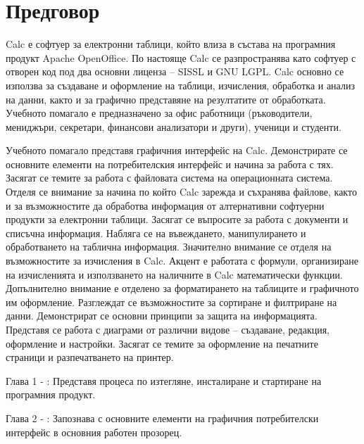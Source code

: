 ﻿\newpage
{}
\chapter*{Предговор}
\setcounter{page}{1}
\pagestyle{fancyplain}

Calc е софтуер за електронни таблици, който влиза в състава на програмния продукт Apache OpenOffice. По настояще Calc се разпространява като софтуер с отворен код под два основни лиценза – SISSL и GNU LGPL. Calc основно се използва за създаване и оформление на таблици, изчисления, обработка и анализ на данни, както и за графично представяне на резултатите от обработката. Учебното помагало е предназначено за офис работници (ръководители, мениджъри, секретари, финансови анализатори и други), ученици и студенти. 

Учебното помагало представя графичния интерфейс на Calc. Демонстрирате се основните елементи на потребителския интерфейс и начина за работа с тях. Засягат се темите за работа с файловата система на операционната система. Отделя се внимание за начина по който Calc зарежда и съхранява файлове, както и за възможностите да обработва информация от алтернативни софтуерни продукти за електронни таблици. Засягат се въпросите за работа с документи и списъчна информация. Набляга се на въвеждането, манипулирането и обработването на таблична информация. Значително внимание се отделя на възможностите за изчисления в Calc. Акцент е работата с формули, организиране на изчисленията и използването на наличните в Calc математически функции. Допълнително внимание е отделено за форматирането на таблиците и графичното им оформление. Разглеждат се възможностите за сортиране и филтриране на данни. Демонстрират се основни принципи за защита на информацията. Представя се работа с диаграми от различни видове – създаване, редакция, оформление и настройки. Засягат се темите за оформление на печатните страници и разпечатването на принтер. 

Глава 1 - : Представя процеса по изтегляне, инсталиране и стартиране на програмния продукт.

Глава 2 - : Запознава с основните елементи на графичния потребителски интерфейс в основния работен прозорец.

